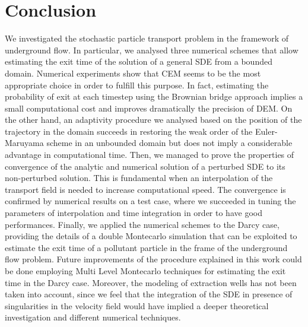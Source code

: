\section{Conclusion}

We investigated the stochastic particle transport problem in the framework of underground flow. In particular, we analysed three numerical schemes that allow estimating the exit time of the solution of a general SDE from a bounded domain. Numerical experiments show that CEM seems to be the most appropriate choice in order to fulfill this purpose. In fact, estimating the probability of exit at each timestep using the Brownian bridge approach implies a small computational cost and improves dramatically the precision of DEM. On the other hand, an adaptivity procedure we analysed based on the position of the trajectory in the domain succeeds in restoring the weak order of the Euler-Maruyama scheme in an unbounded domain but does not imply a considerable advantage in computational time. Then, we managed to prove the properties of convergence of the analytic and numerical solution of a perturbed SDE to its non-perturbed solution. This is fundamental when an interpolation of the transport field is needed to increase computational speed. The convergence is confirmed by numerical results on a test case, where we succeeded in tuning the parameters of interpolation and time integration in order to have good performances. Finally, we applied the numerical schemes to the Darcy case, providing the details of a double Montecarlo simulation that can be exploited to estimate the exit time of a pollutant particle in the frame of the underground flow problem. Future improvements of the procedure explained in this work could be done employing Multi Level Montecarlo techniques for estimating the exit time in the Darcy case. Moreover, the modeling of extraction wells has not been taken into account, since we feel that the integration of the SDE in presence of singularities in the velocity field would have implied a deeper theoretical investigation and different numerical techniques.  
